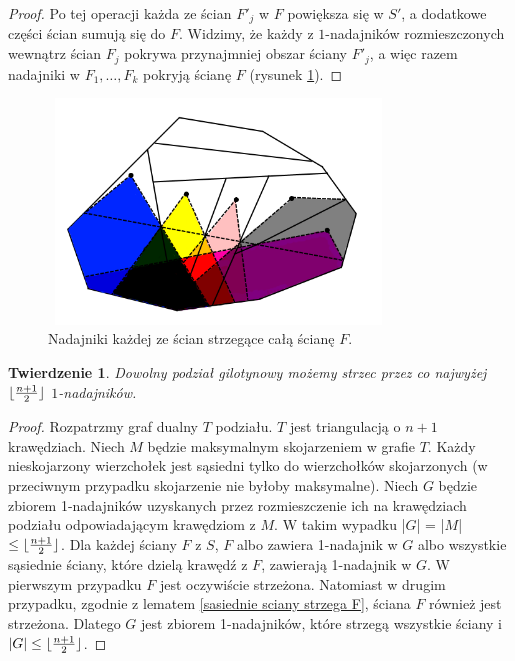 \documentclass[brudnopis]{xmgr}
\DeclarePairedDelimiter\floor{\lfloor}{\rfloor}
\newtheorem{Twierdzenie}{Twierdzenie}
\theoremstyle{definition}
\begin{document}
\begin{proof}
Po tej operacji każda ze ścian $F'_j$ w $F$ powiększa się w $S'$, a dodatkowe części ścian sumują się do $F$. Widzimy, że każdy z $1$-nadajników rozmieszczonych wewnątrz ścian $F_j$ pokrywa przynajmniej obszar ściany $F'_j$, a więc razem nadajniki w $F_1,\ldots,F_k$ pokryją ścianę $F$ (rysunek \ref{fig:pokrycie f}).
\end{proof}

\begin{figure}[ht!]
  \centering
  \includegraphics[width=9cm,height=6cm]{rysunki/pokrycie_f.png}
  \caption{Nadajniki każdej ze ścian strzegące całą ścianę $F$.}
  \label{fig:pokrycie f}
\end{figure} 

\begin{Twierdzenie} \cite{knadajniki}
  Dowolny podział gilotynowy możemy strzec przez co najwyżej $\floor{\frac{n+1}{2}}$ $1$-nadajników.
\end{Twierdzenie}
\begin{proof}
	Rozpatrzmy graf dualny $T$ podziału. $T$ jest triangulacją o $n + 1$ krawędziach. Niech $M$ będzie maksymalnym skojarzeniem w grafie $T$. Każdy nieskojarzony wierzchołek jest sąsiedni tylko do wierzchołków skojarzonych (w przeciwnym przypadku skojarzenie nie byłoby maksymalne). Niech $G$ będzie zbiorem 1-nadajników uzyskanych przez rozmieszczenie ich na krawędziach podziału odpowiadającym krawędziom z $M$. W takim wypadku |$G$| = |$M$| $\le \floor{\frac{n+1}{2}}$. Dla każdej ściany $F$ z $S$, $F$ albo zawiera 1-nadajnik w $G$ albo wszystkie sąsiednie ściany, które dzielą krawędź z $F$, zawierają 1-nadajnik w $G$. W pierwszym przypadku $F$ jest oczywiście strzeżona. Natomiast w drugim przypadku, zgodnie z lematem \ref{sasiednie sciany strzega F}, ściana $F$ również jest strzeżona. Dlatego $G$ jest zbiorem 1-nadajników, które strzegą wszystkie ściany i $|G| \le \floor{\frac{n+1}{2}}$.
\end{proof}
\end{document}
